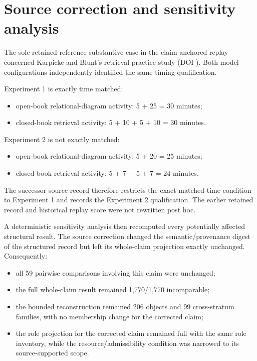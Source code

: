 \documentclass[11pt]{article}
\begin{document}
\section{Source correction and sensitivity analysis}

The sole retained-reference substantive case in the claim-anchored replay concerned Karpicke and Blunt's retrieval-practice study (DOI ). Both model configurations independently identified the same timing qualification.

Experiment 1 is exactly time matched:
\begin{itemize}[leftmargin=*]
\item open-book relational-diagram activity: 5 + 25 = 30 minutes;
\item closed-book retrieval activity: 5 + 10 + 5 + 10 = 30 minutes.
\end{itemize}

Experiment 2 is not exactly matched:
\begin{itemize}[leftmargin=*]
\item open-book relational-diagram activity: 5 + 20 = 25 minutes;
\item closed-book retrieval activity: 5 + 7 + 5 + 7 = 24 minutes.
\end{itemize}

The successor source record therefore restricts the exact matched-time condition to Experiment 1 and records the Experiment 2 qualification. The earlier retained record and historical replay score were not rewritten post hoc.

A deterministic sensitivity analysis then recomputed every potentially affected structural result. The source correction changed the semantic/provenance digest of the structured record but left its whole-claim projection exactly unchanged. Consequently:
\begin{itemize}[leftmargin=*]
\item all 59 pairwise comparisons involving this claim were unchanged;
\item the full whole-claim result remained 1,770/1,770 incomparable;
\item the bounded reconstruction remained 206 objects and 99 cross-stratum families, with no membership change for the corrected claim;
\item the role projection for the corrected claim remained full with the same role inventory, while the resource/admissibility condition was narrowed to its source-supported scope.
\end{itemize}
\end{document}
